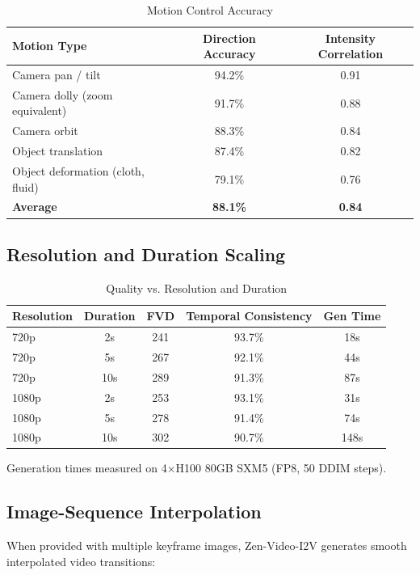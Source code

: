 \documentclass[11pt,a4paper]{article}
\begin{document}
\begin{table}[H]
\centering
\caption{Motion Control Accuracy}
\begin{tabular}{lcc}
\toprule
\textbf{Motion Type} & \textbf{Direction Accuracy} & \textbf{Intensity Correlation} \\
\midrule
Camera pan / tilt & 94.2\% & 0.91 \\
Camera dolly (zoom equivalent) & 91.7\% & 0.88 \\
Camera orbit & 88.3\% & 0.84 \\
Object translation & 87.4\% & 0.82 \\
Object deformation (cloth, fluid) & 79.1\% & 0.76 \\
\textbf{Average} & \textbf{88.1\%} & \textbf{0.84} \\
\bottomrule
\end{tabular}
\end{table}

\subsection{Resolution and Duration Scaling}

\begin{table}[H]
\centering
\caption{Quality vs. Resolution and Duration}
\begin{tabular}{lcccc}
\toprule
\textbf{Resolution} & \textbf{Duration} & \textbf{FVD} & \textbf{Temporal Consistency} & \textbf{Gen Time} \\
\midrule
720p & 2s & 241 & 93.7\% & 18s \\
720p & 5s & 267 & 92.1\% & 44s \\
720p & 10s & 289 & 91.3\% & 87s \\
1080p & 2s & 253 & 93.1\% & 31s \\
1080p & 5s & 278 & 91.4\% & 74s \\
1080p & 10s & 302 & 90.7\% & 148s \\
\bottomrule
\end{tabular}
\end{table}

Generation times measured on 4$\times$H100 80GB SXM5 (FP8, 50 DDIM steps).

\subsection{Image-Sequence Interpolation}

When provided with multiple keyframe images, Zen-Video-I2V generates smooth interpolated video transitions:
\end{document}
